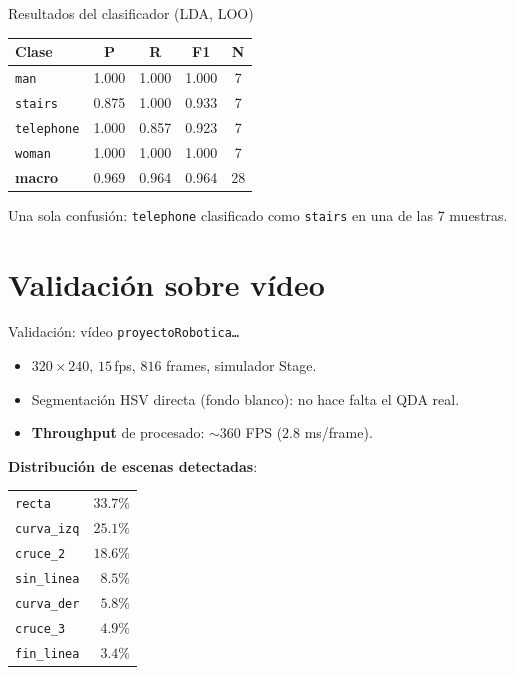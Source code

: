 \begin{frame}{Resultados del clasificador (LDA, LOO)}
\small
\begin{tabular}{lcccc}
\hline
\textbf{Clase} & \textbf{P} & \textbf{R} & \textbf{F1} & \textbf{N}\\\hline
\texttt{man}        & 1.000 & 1.000 & 1.000 & 7\\
\texttt{stairs}     & 0.875 & 1.000 & 0.933 & 7\\
\texttt{telephone}  & 1.000 & 0.857 & 0.923 & 7\\
\texttt{woman}      & 1.000 & 1.000 & 1.000 & 7\\\hline
\textbf{macro}      & 0.969 & 0.964 & 0.964 & 28\\\hline
\end{tabular}

\medskip
Una sola confusión: \texttt{telephone} clasificado como \texttt{stairs} en una de las 7 muestras.
\end{frame}


\section{Validación sobre vídeo}

\begin{frame}{Validación: vídeo \texttt{proyectoRobotica\dots}}
\begin{itemize}
  \item $320 \times 240$, $15$\,fps, $816$ frames, simulador Stage.
  \item Segmentación HSV directa (fondo blanco): no hace falta el QDA real.
  \item \textbf{Throughput} de procesado: $\sim\!360$ FPS ($2.8$ ms/frame).
\end{itemize}

\medskip
\textbf{Distribución de escenas detectadas}:
\begin{center}
\small
\begin{tabular}{lr}
\texttt{recta}      &  $33.7\%$\\
\texttt{curva\_izq} &  $25.1\%$\\
\texttt{cruce\_2}   &  $18.6\%$\\
\texttt{sin\_linea} &  $8.5\%$\\
\texttt{curva\_der} &  $5.8\%$\\
\texttt{cruce\_3}   &  $4.9\%$\\
\texttt{fin\_linea} &  $3.4\%$
\end{tabular}
\end{center}
\end{frame}

